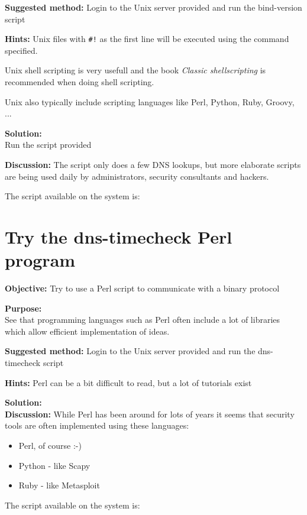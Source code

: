 \documentclass[a4paper,11pt,notitlepage]{report}
\begin{document}
{\bf Suggested method:}
Login to the Unix server provided and run the bind-version script

{\bf Hints:}
Unix files with \verb+#!+ as the first line will be executed using the command specified.

Unix shell scripting is very usefull and the book
\emph{Classic shellscripting} is recommended when doing shell scripting.

Unix also typically include scripting languages like Perl, Python, Ruby, Groovy, ...

{\bf Solution:}\\
Run the script provided

{\bf Discussion:}
The script only does a few DNS lookups, but more elaborate scripts are being used daily by administrators, security consultants and hackers.

The script available on the system is:
{\small
{}
}


\chapter{Try the dns-timecheck Perl program}
\label{ex:dns-timecheck}

{\bf Objective:}
Try to use a Perl script to communicate with a binary protocol

{\bf Purpose:}\\
See that programming languages such as Perl often include a lot of libraries which allow efficient implementation of ideas.

{\bf Suggested method:}
Login to the Unix server provided and run the dns-timecheck script

{\bf Hints:}
Perl can be a bit difficult to read, but a lot of tutorials exist

{\bf Solution:}\\

{\bf Discussion:}
While Perl has been around for lots of years it seems that security tools are often implemented using these languages:
\begin{itemize}
\item Perl, of course :-)
\item Python - like Scapy
\item Ruby - like Metasploit
\end{itemize}

The script available on the system is:
{\small
{}
}
\end{document}
